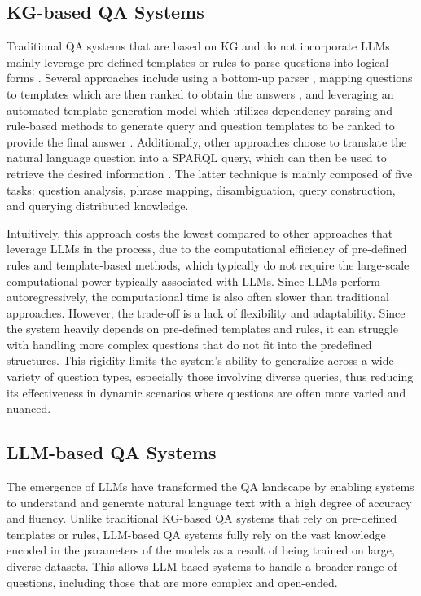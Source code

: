 \subsection{KG-based QA Systems}
Traditional QA systems that are based on KG and do not incorporate LLMs 
mainly leverage pre-defined templates or rules to parse questions
into logical forms \citep{fu2020surveycomplexquestionanswering}. Several
approaches include using a bottom-up parser \citep{Berant2013SemanticPO}, 
mapping questions to templates which are then ranked to obtain the 
answers \citep{bastqafreebase2015}, and leveraging an automated template
generation model which utilizes dependency parsing and rule-based methods
to generate query and question templates to be ranked to provide the
final answer \citep{abujabaltemplategeneration}. Additionally, other 
approaches choose to translate the natural language question into a 
SPARQL query, which can then be used to retrieve the desired 
information \citep{Diefenbach2018}. The latter technique is mainly
composed of five tasks: question analysis, phrase mapping, 
disambiguation, query construction, and querying distributed knowledge.

Intuitively, this approach costs the lowest compared to other approaches
that leverage LLMs in the process, due to the computational efficiency 
of pre-defined rules and template-based methods, which typically do not 
require the large-scale computational power typically associated with 
LLMs. Since LLMs perform autoregressively, the computational time is also 
often slower than traditional approaches. However, the trade-off is a 
lack of flexibility and adaptability. 
Since the system heavily depends on pre-defined templates and rules, it 
can struggle with handling more complex 
questions that do not fit into the predefined structures. This 
rigidity limits the system's ability to generalize across a wide variety 
of question types, especially those involving diverse queries, 
thus reducing its effectiveness in dynamic scenarios where questions are 
often more varied and nuanced.


\subsection{LLM-based QA Systems}
\label{llmqa}
The emergence of LLMs have transformed the QA landscape by enabling systems
to understand and generate natural language text with a high degree of
accuracy and fluency. Unlike traditional KG-based QA systems that rely
on pre-defined templates or rules, LLM-based QA systems fully rely on
the vast knowledge encoded in the parameters of the models as a result
of being trained on large, diverse datasets. This allows LLM-based systems
to handle a broader range of questions, including those that are more
complex and open-ended.

